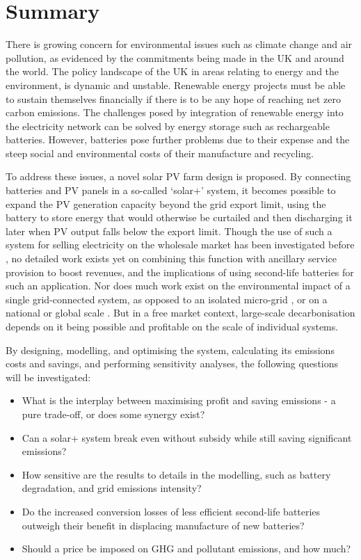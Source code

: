 \documentclass[report_18month.tex]{subfiles}
\begin{document}
\section{Summary}
There is growing concern for environmental issues such as climate change and air pollution, as evidenced by the commitments being made in the UK and around the world. The policy landscape of the UK in areas relating to energy and the environment, is dynamic and unstable. Renewable energy projects must be able to sustain themselves financially if there is to be any hope of reaching net zero carbon emissions. The challenges posed by integration of renewable energy into the electricity network can be solved by energy storage such as rechargeable batteries. However, batteries pose further problems due to their expense and the steep social and environmental costs of their manufacture and recycling.

To address these issues, a novel solar PV farm design is proposed. By connecting batteries and PV panels in a so-called `solar+' system, it becomes possible to expand the PV generation capacity beyond the grid export limit, using the battery to store energy that would otherwise be curtailed and then discharging it later when PV output falls below the export limit. Though the use of such a system for selling electricity on the wholesale market has been investigated before \cite{zhang2017sweden}, no detailed work exists yet on combining this function with ancillary service provision to boost revenues, and the implications of using second-life batteries for such an application. Nor does much work exist on the environmental impact of a single grid-connected system, as opposed to an isolated micro-grid \cite{fadaee2012standalone,stadler2009expensiveco2}, or on a national or global scale \cite{strbac2012strategic,bussar2016eu,carbajales2014storage}. But in a free market context, large-scale decarbonisation depends on it being possible and profitable on the scale of individual systems.

By designing, modelling, and optimising the system, calculating its emissions costs and savings, and performing sensitivity analyses, the following questions will be investigated:
\begin{itemize}
\item What is the interplay between maximising profit and saving emissions - a pure trade-off, or does some synergy exist?
\item Can a solar+ system break even without subsidy while still saving significant emissions?
\item How sensitive are the results to details in the modelling, such as battery degradation, and grid emissions intensity?
\item Do the increased conversion losses of less efficient second-life batteries outweigh their benefit in displacing manufacture of new batteries?
\item Should a price be imposed on GHG and pollutant emissions, and how much?
\end{itemize}
\end{document}

